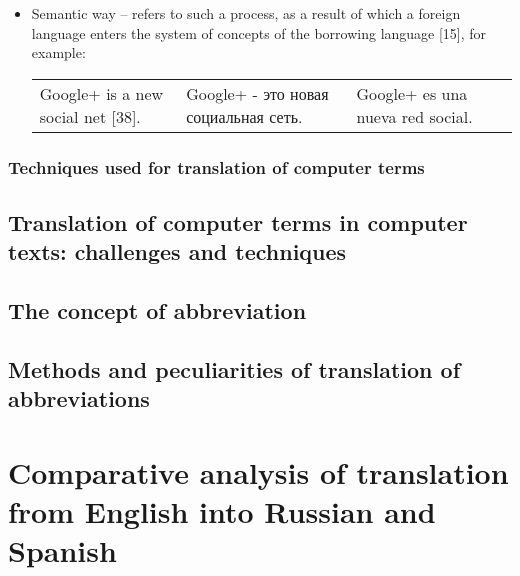 \documentclass[12pt, a4paper, twoside]{report}
\begin{document}
\begin{itemize}
    \item Semantic way –  refers to such a process, as a result of which a foreign language enters the system of concepts of the borrowing language [15], for example: \\
    
    \begin{table}[H]
        \centering
        \begin{tabular}{ | m{3cm} | m{3cm}| m{3cm} | m{3cm} | } 
            Google+ is a new social net [38]. &   Google+ - это новая социальная сеть. & Google+ es una nueva red social. \\ 
        \end{tabular}
    \end{table}
\end{itemize}

\subsection{Techniques used for translation of computer terms}

\section{Translation of computer terms in computer texts: challenges and techniques}

\section{The concept of abbreviation}

\section{Methods and peculiarities of translation of abbreviations}

\chapter{Comparative analysis of translation from English into Russian and Spanish}
\end{document}
